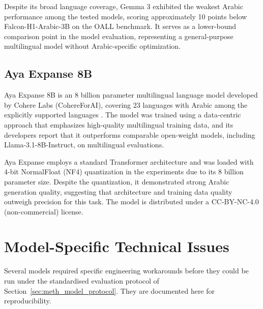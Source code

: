 Despite its broad language coverage, Gemma 3 exhibited the weakest Arabic performance among the tested models, scoring approximately 10 points below Falcon-H1-Arabic-3B on the OALL benchmark. It serves as a lower-bound comparison point in the model evaluation, representing a general-purpose multilingual model without Arabic-specific optimization.

\subsection{Aya Expanse 8B}
\label{sec:aya}

Aya Expanse 8B is an 8 billion parameter multilingual language model developed by Cohere Labs (CohereForAI), covering 23 languages with Arabic among the explicitly supported languages \cite{aya_2024}. The model was trained using a data-centric approach that emphasizes high-quality multilingual training data, and its developers report that it outperforms comparable open-weight models, including Llama-3.1-8B-Instruct, on multilingual evaluations.

Aya Expanse employs a standard Transformer architecture and was loaded with 4-bit NormalFloat (NF4) quantization in the experiments due to its 8 billion parameter size. Despite the quantization, it demonstrated strong Arabic generation quality, suggesting that architecture and training data quality outweigh precision for this task. The model is distributed under a CC-BY-NC-4.0 (non-commercial) license.

\section{Model-Specific Technical Issues}
\label{app:model_issues}

Several models required specific engineering workarounds before they could be run
under the standardised evaluation protocol of Section~\ref{sec:meth_model_protocol}.
They are documented here for reproducibility.

